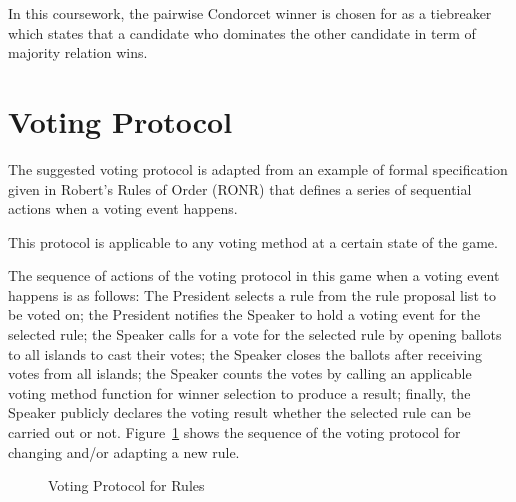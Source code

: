 In this coursework, the pairwise Condorcet winner is chosen for as a tiebreaker which states that a candidate who dominates the other candidate in term of majority relation wins.

\section{Voting Protocol}
\label{sec:VotingProtocol}
The suggested voting protocol is adapted from an example of formal specification given in Robert's Rules of Order (RONR) that defines a series of sequential actions when a voting event happens.

This protocol is applicable to any voting method at a certain state of the game.

The sequence of actions of the voting protocol in this game when a voting event happens is as follows: The President selects a rule from the rule proposal list to be voted on; the President notifies the Speaker to hold a voting event for the selected rule; the Speaker calls for a vote for the selected rule by opening ballots to all islands to cast their votes; the Speaker closes the ballots after receiving votes from all islands; the Speaker counts the votes by calling an applicable voting method function for winner selection to produce a result; finally, the Speaker publicly declares the voting result whether the selected rule can be carried out or not. Figure~\ref{fig:RONRVotingProtocol} shows the sequence of the voting protocol for changing and/or adapting a new rule.


\begin{figure}[H]
\begin{center}
\caption{Voting Protocol for Rules}
\label{fig:RONRVotingProtocol}
\end{center}
\end{figure}

